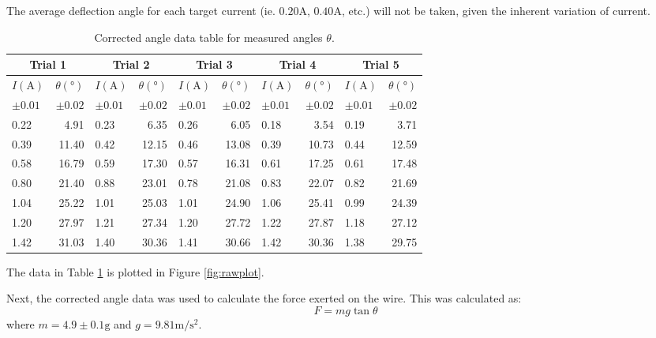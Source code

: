 The average deflection angle for each target current (ie. $0.20\si{\ampere}$, $0.40\si{\ampere}$, etc.) will not be taken, given the inherent variation of current.

\begin{table}[H]
	\centering
	\onehalfspacing
	\begin{tabular}{|lr||lr||lr||lr||lr|}
		\hline
		\multicolumn{2}{|c||}{Trial 1} & \multicolumn{2}{|c||}{Trial 2} & \multicolumn{2}{c||}{Trial 3}& \multicolumn{2}{c||}{Trial 4}& \multicolumn{2}{c|}{Trial 5} \\
		\hline
		$I(\si{\ampere})$ & $\theta(\si{\degree})$ & $I(\si{\ampere})$ & $\theta(\si{\degree})$ & $I(\si{\ampere})$ & $\theta(\si{\degree})$ & $I(\si{\ampere})$ & $\theta(\si{\degree})$ & $I(\si{\ampere})$ & $\theta(\si{\degree})$ \\
		$\pm0.01$ & $\pm0.02$ & $\pm0.01$ & $\pm0.02$ & $\pm0.01$ & $\pm0.02$ & $\pm0.01$ & $\pm0.02$ & $\pm0.01$ & $\pm0.02$ \\
		\hline
		0.22 & 4.91 & 0.23 & 6.35 & 0.26 & 6.05 & 0.18 & 3.54 & 0.19 & 3.71 \\
		0.39 & 11.40 & 0.42 & 12.15 & 0.46 & 13.08 & 0.39 & 10.73 & 0.44 & 12.59 \\
		0.58 & 16.79 & 0.59 & 17.30 & 0.57 & 16.31 & 0.61 & 17.25 & 0.61 & 17.48 \\
		0.80 & 21.40 & 0.88 & 23.01 & 0.78 & 21.08 & 0.83 & 22.07 & 0.82 & 21.69 \\
		1.04 & 25.22 & 1.01 & 25.03 & 1.01 & 24.90 & 1.06 & 25.41 & 0.99 & 24.39 \\
		1.20 & 27.97 & 1.21 & 27.34 & 1.20 & 27.72 & 1.22 & 27.87 & 1.18 & 27.12 \\
		1.42 & 31.03 & 1.40 & 30.36 & 1.41 & 30.66 & 1.42 & 30.36 & 1.38 & 29.75 \\
		\hline
	\end{tabular}
	\caption{Corrected angle data table for measured angles $\theta$.}
	\vspace{-10pt}
	\label{tab:raw2}
\end{table}

The data in Table \ref{tab:raw2} is plotted in Figure \ref{fig:rawplot}.

Next, the corrected angle data was used to calculate the force exerted on the wire. This was calculated as:
\begin{equation*}
	F = mg \tan\theta
\end{equation*}
where $m = 4.9\pm0.1\si{\gram}$ and $g = 9.81\si{\meter\per\second\squared}$.

